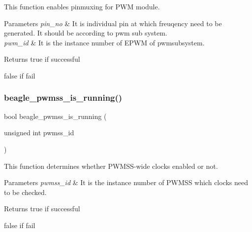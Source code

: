 This function enables pinmuxing for P\+WM module. 


\begin{DoxyParams}{Parameters}
{\em pin\+\_\+no} & It is individual pin at which freuqency need to be generated. It should be according to pwm sub system.\\
\hline
{\em pwm\+\_\+id} & It is the instance number of E\+P\+WM of pwmsubsystem.\\
\hline
\end{DoxyParams}
\begin{DoxyReturn}{Returns}
true if successful 

false if fail 
\end{DoxyReturn}
\mbox{\label{bbb-pwm_8h_a271bcad80c7a9b5188e50d88182b1b7d}} 
\subsubsection{\texorpdfstring{beagle\_pwmss\_is\_running()}{beagle\_pwmss\_is\_running()}}
{\footnotesize\ttfamily bool beagle\+\_\+pwmss\+\_\+is\+\_\+running (\begin{DoxyParamCaption}\item[{unsigned int}]{pwmss\+\_\+id }\end{DoxyParamCaption})}



This function determines whether P\+W\+M\+S\+S-\/wide clocks enabled or not. 


\begin{DoxyParams}{Parameters}
{\em pwmss\+\_\+id} & It is the instance number of P\+W\+M\+SS which clocks need to be checked.\\
\hline
\end{DoxyParams}
\begin{DoxyReturn}{Returns}
true if successful 

false if fail 
\end{DoxyReturn}
